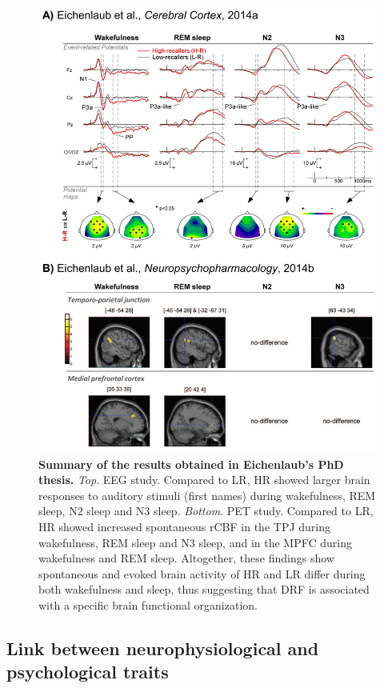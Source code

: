 \begin{figure}[!htb]
	\includegraphics[width=\textwidth]{Fig/Intro/Intro_JBE_summary/Intro_JBE_summary.png}
	\caption[Summary of the results obtained in Eichenlaub's PhD thesis]{\textbf{Summary of the results obtained in Eichenlaub's PhD thesis.} \emph{Top}. EEG study. Compared to LR, HR showed larger brain responses to auditory stimuli (first names) during wakefulness, REM sleep, N2 sleep and N3 sleep. \emph{Bottom}. PET study. Compared to LR, HR showed increased spontaneous rCBF in the TPJ during wakefulness, REM sleep and N3 sleep, and in the MPFC during wakefulness and REM sleep. Altogether, these findings show spontaneous and evoked brain activity of HR and LR differ during both wakefulness and sleep, thus suggesting that DRF is associated with a specific brain functional organization.}
	\label{fig:intro:jbe-summary}
\end{figure}

\subsection{Link between neurophysiological and psychological traits}
\label{sec:dream-recall:param:link}

